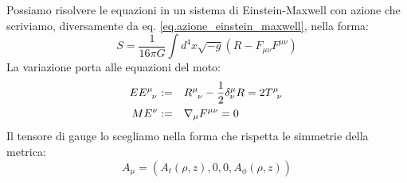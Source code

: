 Possiamo risolvere le equazioni in un sistema di Einstein-Maxwell con azione che scriviamo, diversamente da eq. \ref{eq.azione_einstein_maxwell}, nella forma:
\begin{equation*}
    S = \frac{1}{16\pi G}\int d^4x \sqrt{-g} \left( R - F_ {\mu\nu} F^{\mu\nu} \right)
\end{equation*}
La variazione porta alle equazioni del moto:
\begin{align}
    \tensor{EE}{^\mu_\nu} :=& \quad \tensor{R}{^\mu_\nu} - \frac{1}{2}\delta^\mu_\nu R = 2 \tensor{T}{^\mu_\nu} \label{eq.ee}\\
   ME^\nu :=& \quad \nabla_\mu F^{\mu\nu} = 0 \label{eq.me}
\end{align}
Il tensore di gauge lo scegliamo nella forma che rispetta le simmetrie della metrica:
\begin{equation}
    A_\mu = \left( A_t(\rho,z), 0,0, A_\phi(\rho,z)\right)
    \label{eq.pot_gauge_cilindrico}
\end{equation}

